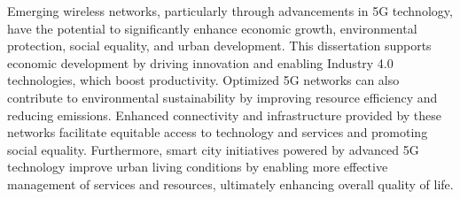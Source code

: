 Emerging wireless networks, particularly through advancements in 5G technology, have the potential to significantly enhance economic growth, environmental protection, social equality, and urban development.
This dissertation supports economic development by driving innovation and enabling Industry 4.0 technologies, which boost productivity.
Optimized 5G networks can also contribute to environmental sustainability by improving resource efficiency and reducing emissions.
Enhanced connectivity and infrastructure provided by these networks facilitate equitable access to technology and services and promoting social equality.
Furthermore, smart city initiatives powered by advanced 5G technology improve urban living conditions by enabling more effective management of services and resources, ultimately enhancing overall quality of life.